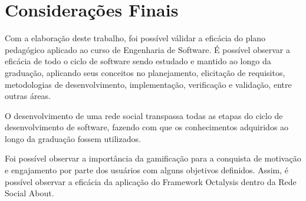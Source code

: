\chapter[Considerações Finais]{Considerações Finais}

Com a elaboração deste trabalho, foi possível válidar
a eficácia do plano pedagógico aplicado ao curso de Engenharia de Software.
É possível observar a eficácia de todo o ciclo de software
sendo estudado e mantido ao longo da graduação, aplicando seus conceitos
no planejamento, elicitação de requisitos, metodologias de desenvolvimento,
implementação, verificação e validação, entre outras áreas.

O desenvolvimento de uma rede social transpassa todas as etapas do
ciclo de desenvolvimento de software, fazendo com que os conhecimentos
adquiridos ao longo da graduação fossem utilizados.

Foi possível observar a importância da gamificação para a conquista
de motivação e engajamento por parte dos usuários com alguns objetivos
definidos. Assim, é possível observar a eficácia da aplicação do Framework
Octalysis dentro da Rede Social About.
